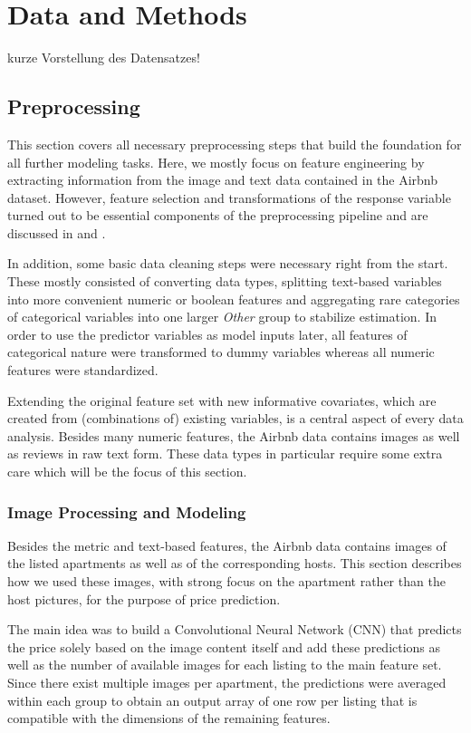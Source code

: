\section{Data and Methods}

kurze Vorstellung des Datensatzes!

\subsection{Preprocessing}

This section covers all necessary preprocessing steps that build the foundation for all further modeling tasks.
Here, we mostly focus on feature engineering by extracting information from the image and text data contained in the Airbnb dataset.
However, feature selection and transformations of the response variable turned out to be essential components of the preprocessing pipeline and are discussed in  and .

In addition, some basic data cleaning steps were necessary right from the start.
These mostly consisted of converting data types, splitting text-based variables into more convenient numeric or boolean features and aggregating rare categories of categorical variables into one larger \emph{Other} group to stabilize estimation.
In order to use the predictor variables as model inputs later, all features of categorical nature were transformed to dummy variables whereas all numeric features were standardized.

Extending the original feature set with new informative covariates, which are created from (combinations of) existing variables, is a central aspect of every data analysis.
Besides many numeric features, the Airbnb data contains images as well as reviews in raw text form.
These data types in particular require some extra care which will be the focus of this section.

\subsubsection{Image Processing and Modeling}

Besides the metric and text-based features, the Airbnb data contains images of the listed apartments as well as of the corresponding hosts.
This section describes how we used these images, with strong focus on the apartment rather than the host pictures, for the purpose of price prediction.

The main idea was to build a Convolutional Neural Network (CNN) that predicts the price solely based on the image content itself and add these predictions as well as the number of available images for each listing to the main feature set.
Since there exist multiple images per apartment, the predictions were averaged within each group to obtain an output array of one row per listing that is compatible with the dimensions of the remaining features.

